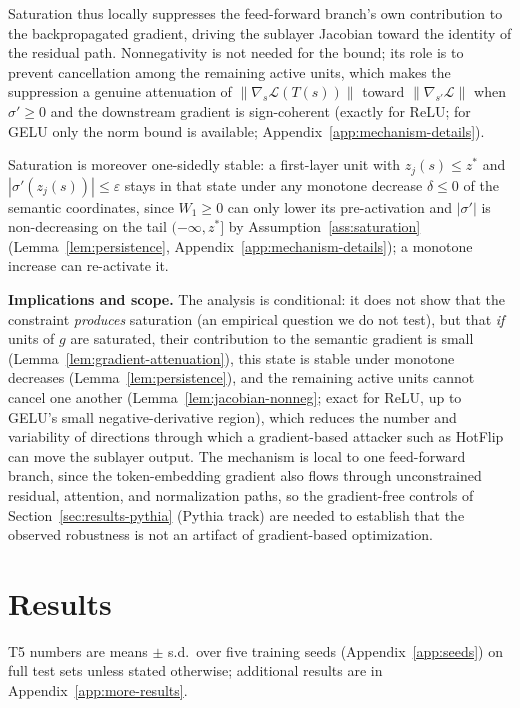 \documentclass{article}
\theoremstyle{plain}
\theoremstyle{definition}
\theoremstyle{remark}
\theoremstyle{plain}
\begin{document}
Saturation thus locally suppresses the feed-forward branch's own contribution to the backpropagated gradient, driving the sublayer Jacobian toward the identity of the residual path. Nonnegativity is not needed for the bound; its role is to prevent cancellation among the remaining active units, which makes the suppression a genuine attenuation of $\|\nabla_s\mathcal{L}(T(s))\|$ toward $\|\nabla_{s'}\mathcal{L}\|$ when $\sigma' \ge 0$ and the downstream gradient is sign-coherent (exactly for ReLU; for GELU only the norm bound is available; Appendix~\ref{app:mechanism-details}).

Saturation is moreover one-sidedly stable: a first-layer unit with $z_j(s) \le z^\ast$ and $|\sigma'(z_j(s))| \le \varepsilon$ stays in that state under any monotone decrease $\delta \le 0$ of the semantic coordinates, since $W_1 \ge 0$ can only lower its pre-activation and $|\sigma'|$ is non-decreasing on the tail $(-\infty, z^\ast]$ by Assumption~\ref{ass:saturation} (Lemma~\ref{lem:persistence}, Appendix~\ref{app:mechanism-details}); a monotone increase can re-activate it.

\textbf{Implications and scope.}
The analysis is conditional: it does not show that the constraint \emph{produces} saturation (an empirical question we do not test), but that \emph{if} units of $g$ are saturated, their contribution to the semantic gradient is small (Lemma~\ref{lem:gradient-attenuation}), this state is stable under monotone decreases (Lemma~\ref{lem:persistence}), and the remaining active units cannot cancel one another (Lemma~\ref{lem:jacobian-nonneg}; exact for ReLU, up to GELU's small negative-derivative region), which reduces the number and variability of directions through which a gradient-based attacker such as HotFlip can move the sublayer output. The mechanism is local to one feed-forward branch, since the token-embedding gradient also flows through unconstrained residual, attention, and normalization paths, so the gradient-free controls of Section~\ref{sec:results-pythia} (Pythia track) are needed to establish that the observed robustness is not an artifact of gradient-based optimization.

\section{Results}
\label{sec:results}
T5 numbers are means $\pm$ s.d.\ over five training seeds (Appendix~\ref{app:seeds}) on full test sets unless stated otherwise; additional results are in Appendix~\ref{app:more-results}.
\end{document}

